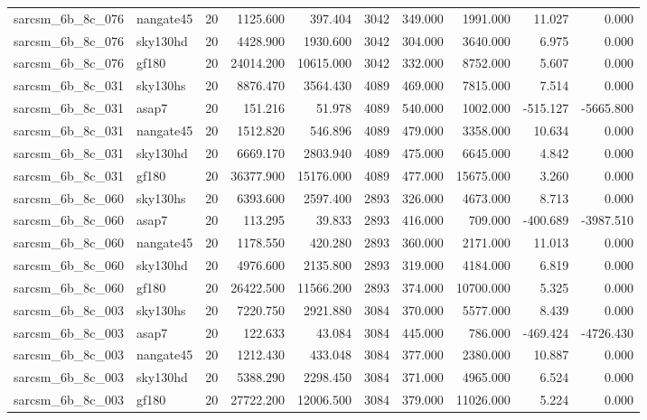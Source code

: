 \documentclass{article}
\begin{document}
\begin{longtable}{llrrrrrrrr}
sarcsm\_6b\_8c\_076 & nangate45 & 20 & 1125.600 & 397.404 & 3042 & 349.000 & 1991.000 & 11.027 & 0.000 \\
sarcsm\_6b\_8c\_076 & sky130hd & 20 & 4428.900 & 1930.600 & 3042 & 304.000 & 3640.000 & 6.975 & 0.000 \\
sarcsm\_6b\_8c\_076 & gf180 & 20 & 24014.200 & 10615.000 & 3042 & 332.000 & 8752.000 & 5.607 & 0.000 \\
sarcsm\_6b\_8c\_031 & sky130hs & 20 & 8876.470 & 3564.430 & 4089 & 469.000 & 7815.000 & 7.514 & 0.000 \\
sarcsm\_6b\_8c\_031 & asap7 & 20 & 151.216 & 51.978 & 4089 & 540.000 & 1002.000 & -515.127 & -5665.800 \\
sarcsm\_6b\_8c\_031 & nangate45 & 20 & 1512.820 & 546.896 & 4089 & 479.000 & 3358.000 & 10.634 & 0.000 \\
sarcsm\_6b\_8c\_031 & sky130hd & 20 & 6669.170 & 2803.940 & 4089 & 475.000 & 6645.000 & 4.842 & 0.000 \\
sarcsm\_6b\_8c\_031 & gf180 & 20 & 36377.900 & 15176.000 & 4089 & 477.000 & 15675.000 & 3.260 & 0.000 \\
sarcsm\_6b\_8c\_060 & sky130hs & 20 & 6393.600 & 2597.400 & 2893 & 326.000 & 4673.000 & 8.713 & 0.000 \\
sarcsm\_6b\_8c\_060 & asap7 & 20 & 113.295 & 39.833 & 2893 & 416.000 & 709.000 & -400.689 & -3987.510 \\
sarcsm\_6b\_8c\_060 & nangate45 & 20 & 1178.550 & 420.280 & 2893 & 360.000 & 2171.000 & 11.013 & 0.000 \\
sarcsm\_6b\_8c\_060 & sky130hd & 20 & 4976.600 & 2135.800 & 2893 & 319.000 & 4184.000 & 6.819 & 0.000 \\
sarcsm\_6b\_8c\_060 & gf180 & 20 & 26422.500 & 11566.200 & 2893 & 374.000 & 10700.000 & 5.325 & 0.000 \\
sarcsm\_6b\_8c\_003 & sky130hs & 20 & 7220.750 & 2921.880 & 3084 & 370.000 & 5577.000 & 8.439 & 0.000 \\
sarcsm\_6b\_8c\_003 & asap7 & 20 & 122.633 & 43.084 & 3084 & 445.000 & 786.000 & -469.424 & -4726.430 \\
sarcsm\_6b\_8c\_003 & nangate45 & 20 & 1212.430 & 433.048 & 3084 & 377.000 & 2380.000 & 10.887 & 0.000 \\
sarcsm\_6b\_8c\_003 & sky130hd & 20 & 5388.290 & 2298.450 & 3084 & 371.000 & 4965.000 & 6.524 & 0.000 \\
sarcsm\_6b\_8c\_003 & gf180 & 20 & 27722.200 & 12006.500 & 3084 & 379.000 & 11026.000 & 5.224 & 0.000 \\

\end{longtable}
\end{document}
